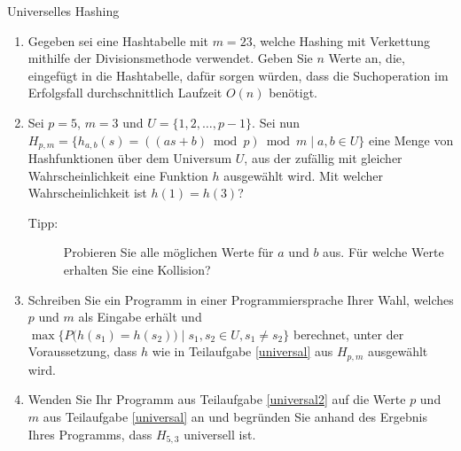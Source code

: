 \documentclass[11pt,a4paper]{article}
\begin{document}
\begin{aufgabe}{5}{\hard Universelles Hashing}
    \begin{enumerate}[label=\alph*)]
        \item Gegeben sei eine Hashtabelle mit $m = 23$, welche Hashing mit Verkettung mithilfe der Divisionsmethode verwendet.
        Geben Sie $n$ Werte an, die, eingefügt in die Hashtabelle, dafür sorgen würden, dass die Suchoperation im Erfolgsfall durchschnittlich Laufzeit $O(n)$ benötigt.
        \item \label{universal}
        Sei $p = 5$, $m = 3$ und $U = \{  1, 2, \ldots, p - 1\}$.
        Sei nun $H_{p,m} = \{h_{a,b}(s) = ((as + b) \bmod{p}) \bmod{m} \mid a, b \in U\}$ eine Menge von Hashfunktionen über dem Universum $U$, aus der zufällig mit gleicher Wahrscheinlichkeit eine Funktion $h$ ausgewählt wird.
        Mit welcher Wahrscheinlichkeit ist $h(1) = h(3)$?
        \begin{description}
            \item[Tipp:] Probieren Sie alle möglichen Werte für $a$ und $b$ aus. Für welche Werte erhalten Sie eine Kollision?
        \end{description}
        \item \label{universal2}
        Schreiben Sie ein Programm in einer Programmiersprache Ihrer Wahl, welches $p$ und $m$ als Eingabe erhält und $\max\{P\big(h(s_1) = h(s_2)\big) \mid s_1, s_2 \in U, s_1 \neq s_2\}$ berechnet, unter der Voraussetzung, dass $h$ wie in Teilaufgabe \ref*{universal} aus $H_{p,m}$ ausgewählt wird.
        \item 
        Wenden Sie Ihr Programm aus Teilaufgabe \ref*{universal2} auf die Werte $p$ und $m$ aus Teilaufgabe \ref*{universal} an und begründen Sie anhand des Ergebnis Ihres Programms, dass $H_{5, 3}$ universell ist.  
    \end{enumerate}
\end{aufgabe}
\end{document}
